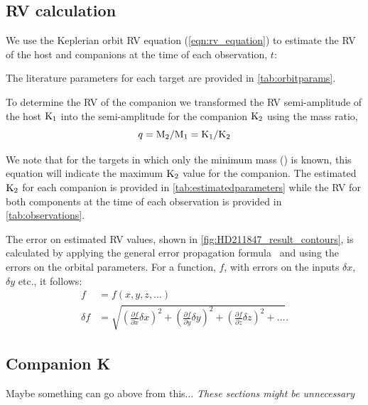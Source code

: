 

\subsection{{RV} calculation}
We use the Keplerian orbit {RV} equation (\cref{eqn:rv_equation}) to estimate the {RV} of the host and companions at the time of each observation, \(t\):

The literature parameters for each target are provided in \cref{tab:orbitparams}.


To determine the {RV} of the companion we transformed the {RV} semi-amplitude of the host \(\textrm{K}_{1}\) into the semi-amplitude for the companion \(\textrm{K}_{2}\) using the mass ratio,
\begin{equation}
\label{eqn:mass_ratio}
q = \textrm{M}_{2} / \textrm{M}_{1} = \textrm{K}_{1} / \textrm{K}_{2}
\end{equation}

We note that for the targets in which only the minimum mass (\Mtwosini) is known, this equation will indicate the maximum \(\textrm{K}_{2}\) value for the companion.
The estimated \(\textrm{K}_{2}\) for each companion is provided in \cref{tab:estimatedparameters} while the {RV} for both components at the time of each observation is provided in \cref{tab:observations}.


The error on estimated {RV} values, shown in \cref{fig:HD211847_result_contours}, is calculated by applying the general error propagation formula~\citep{ku_notes_1966} and using the errors on the orbital parameters.
For a function, \(f\), with errors on the inputs \(\delta x\), \(\delta y\) etc., it follows:
\begin{align}
f &= f(x, y, z, \ldots)\\
\delta f &= \sqrt{{\left( \frac{\partial f}{\partial x} \delta x\right)}^2 + {\left(\frac{\partial f}{\partial y} \delta y\right)}^2 + {\left(\frac{\partial f}{\partial z} \delta z\right)}^2 + \ldots}.
\end{align}




\subsection{Companion K}  Maybe something can go above from this...
\label{sec:companion_RV}
\emph{These sections might be unnecessary}\\

